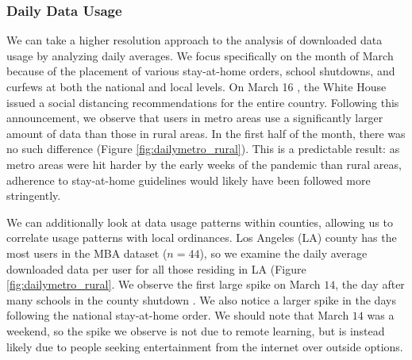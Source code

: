\subsubsection{Daily Data Usage}
We can take a higher resolution approach to the analysis of downloaded data usage by analyzing daily averages. We focus specifically on the month of March because of the placement of various stay-at-home orders, school shutdowns, and curfews at both the national and local levels. On March 16 \cite{trump2020coronavirus}, the White House issued a social distancing recommendations for the entire country. Following this announcement, we observe that users in metro areas use a significantly larger amount of data than those in rural areas. In the first half of the month, there was no such difference (Figure \ref{fig:dailymetro_rural}). This is a predictable result: as metro areas were hit harder by the early weeks of the pandemic than rural areas, adherence to stay-at-home guidelines would likely have been followed more stringently. 

We can additionally look at data usage patterns within counties, allowing us to correlate usage patterns with local ordinances. Los Angeles (LA) county has the most users in the MBA dataset ($n=44$), so we examine the daily average downloaded data per user for all those residing in LA (Figure \ref{fig:dailymetro_rural}. We observe the first large spike on March $14$, the day after many schools in the county shutdown \cite{haire2020LA}. We also notice a larger spike in the days following the national stay-at-home order. We should note that March $14$ was a weekend, so the spike we observe is not due to remote learning, but is instead likely due to people seeking entertainment from the internet over outside options. 

